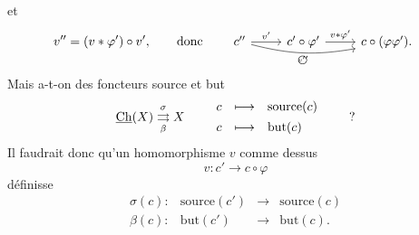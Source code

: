 et
\[
v''=(v*\varphi')\circ v', \qquad \text{donc} \qquad
\begin{tikzcd}
c'' \arrow[r, "v'"] \arrow[rr, bend right=12, "\circled{v''}"'] & c'\circ\varphi' \arrow[r, "v*\varphi'"] & c\circ(\varphi\varphi').
\end{tikzcd}
\]
Mais a-t-on des foncteurs source et but
\[
\underline{\mathrm{Ch}}(X) \overset{\sigma}{\underset{\beta}{\rightrightarrows}} X \qquad
\begin{array}{ccl}
c & \longmapsto & \text{source}(c)\\[1ex]
c & \longmapsto & \text{but}(c)
\end{array}
\qquad ?
\]
Il faudrait donc qu'un homomorphisme $v$ comme dessus
\[
v : c' \longrightarrow c\circ\varphi
\]
définisse
\[
\begin{array}{lrcl}
\sigma(c) : & \text{source}(c') & \longrightarrow & \text{source}(c)\\[1ex]
\beta(c) : & \text{but}(c') & \longrightarrow & \text{but}(c).
\end{array}
\]

